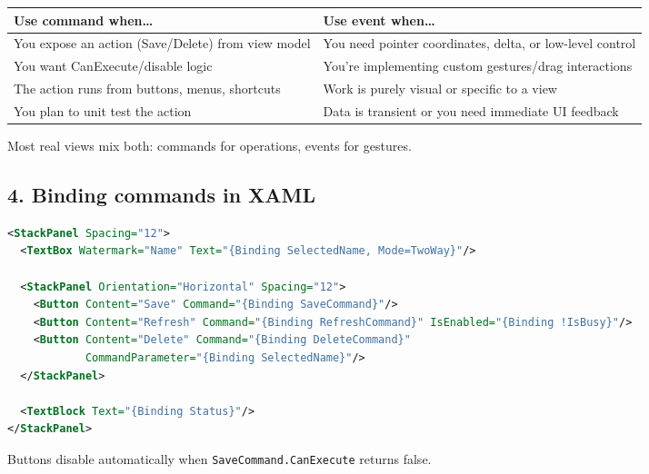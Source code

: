 \begin{longtable}[]{@{}
  >{\raggedright\arraybackslash}p{}
  >{\raggedright\arraybackslash}p{}@{}}
\toprule\noalign{}
\begin{minipage}[b]{\linewidth}\raggedright
Use command when\ldots{}
\end{minipage} & \begin{minipage}[b]{\linewidth}\raggedright
Use event when\ldots{}
\end{minipage} \\
\midrule\noalign{}
\endhead
\bottomrule\noalign{}
\endlastfoot
You expose an action (Save/Delete) from view model & You need pointer
coordinates, delta, or low-level control \\
You want CanExecute/disable logic & You're implementing custom
gestures/drag interactions \\
The action runs from buttons, menus, shortcuts & Work is purely visual
or specific to a view \\
You plan to unit test the action & Data is transient or you need
immediate UI feedback \\
\end{longtable}

Most real views mix both: commands for operations, events for gestures.

\subsection{4. Binding commands in XAML}\label{binding-commands-in-xaml}

\begin{lstlisting}[language=XML]
<StackPanel Spacing="12">
  <TextBox Watermark="Name" Text="{Binding SelectedName, Mode=TwoWay}"/>

  <StackPanel Orientation="Horizontal" Spacing="12">
    <Button Content="Save" Command="{Binding SaveCommand}"/>
    <Button Content="Refresh" Command="{Binding RefreshCommand}" IsEnabled="{Binding !IsBusy}"/>
    <Button Content="Delete" Command="{Binding DeleteCommand}"
            CommandParameter="{Binding SelectedName}"/>
  </StackPanel>

  <TextBlock Text="{Binding Status}"/>
</StackPanel>
\end{lstlisting}

Buttons disable automatically when
\passthrough{\lstinline!SaveCommand.CanExecute!} returns false.

